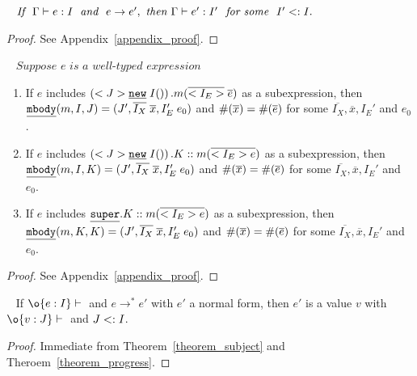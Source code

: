 \begin{theorem}~\label{theorem_subject}
$\textit{If } \ \judgeewf \Gamma {e : I} \; \textit{ and } \ e \rightarrow e',\ 
\textit{then } \judgeewf \Gamma {e' : I'} \ \textit{ for some } \ I' <: I.$
\end{theorem}
\begin{proof}
See Appendix~\ref{appendix_proof}.
\end{proof}

\begin{theorem}[Progress]~\label{theorem_progress}
$\textit{Suppose } e \textit{ is a well-typed expression } $ \\
\begin{enumerate}
\item If $e$ includes $\left(<J>\emph{\texttt{new}}\;I()\right).m(\overline{<I_E>} \; \overline{e})$ as a subexpression,
    then $ \emph{\texttt{mbody}}(m, I, J) = (J', \overline{I_X} \; \overline{x}, I'_E \; e_0) $ and
         $\#(\overline{x}) = \#(\overline{e})$ for some $\overline{I_X}, \overline{x}, I_E'$ and $e_0$.
\item If $e$ includes $\left(<J>\emph{\texttt{new}}\;I()\right).K::m(\overline{<I_E> e})$ as a subexpression,
    then $ \emph{\texttt{mbody}}(m, I, K) = (J', \overline{I_X} \; \overline{x}, I'_E \; e_0) $ and 
         $\#(\overline{x}) = \#(\overline{e})$ for some $\overline{I_X}, \overline{x}, I_E'$ and $e_0$.
\item If $e$ includes $\emph{\texttt{super}}.K::m(\overline{<I_E> e})$ as a subexpression,
    then $ \emph{\texttt{mbody}}(m, K, K) = (J', \overline{I_X} \; \overline{x}, I'_E \; e_0) $ and 
         $\#(\overline{x}) = \#(\overline{e})$ for some $\overline{I_X}, \overline{x}, I_E'$ and $e_0$.
\end{enumerate}
\end{theorem}
\begin{proof}
See Appendix~\ref{appendix_proof}.
\end{proof}

\begin{theorem}~\label{theorem_soundness}
If $\judgeewf \o {e : I}$ and $e \to^* e'$ with $e'$ a normal form, then $e'$ is 
a value $v$ with $\judgeewf \o {v:J}$ and $J <: I$.
\end{theorem}
\begin{proof}
Immediate from Theorem~\ref{theorem_subject} and Theroem~\ref{theorem_progress}.
\end{proof}
